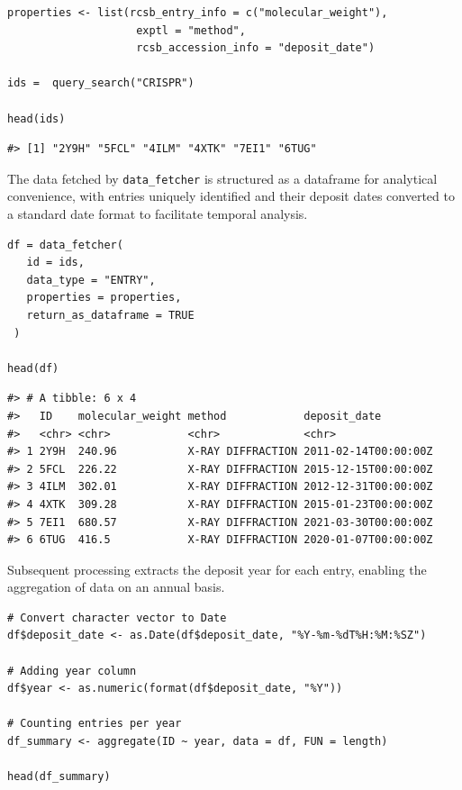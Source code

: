\begin{verbatim}
properties <- list(rcsb_entry_info = c("molecular_weight"),
                    exptl = "method",
                    rcsb_accession_info = "deposit_date")

ids =  query_search("CRISPR")

head(ids)
\end{verbatim}

\begin{verbatim}
#> [1] "2Y9H" "5FCL" "4ILM" "4XTK" "7EI1" "6TUG"
\end{verbatim}

The data fetched by \texttt{data\_fetcher} is structured as a dataframe for analytical convenience, with entries uniquely identified and their deposit dates converted to a standard date format to facilitate temporal analysis.

\begin{verbatim}
df = data_fetcher(
   id = ids,
   data_type = "ENTRY",
   properties = properties,
   return_as_dataframe = TRUE
 )

head(df)
\end{verbatim}

\begin{verbatim}
#> # A tibble: 6 x 4
#>   ID    molecular_weight method            deposit_date        
#>   <chr> <chr>            <chr>             <chr>               
#> 1 2Y9H  240.96           X-RAY DIFFRACTION 2011-02-14T00:00:00Z
#> 2 5FCL  226.22           X-RAY DIFFRACTION 2015-12-15T00:00:00Z
#> 3 4ILM  302.01           X-RAY DIFFRACTION 2012-12-31T00:00:00Z
#> 4 4XTK  309.28           X-RAY DIFFRACTION 2015-01-23T00:00:00Z
#> 5 7EI1  680.57           X-RAY DIFFRACTION 2021-03-30T00:00:00Z
#> 6 6TUG  416.5            X-RAY DIFFRACTION 2020-01-07T00:00:00Z
\end{verbatim}

Subsequent processing extracts the deposit year for each entry, enabling the aggregation of data on an annual basis.

\begin{verbatim}
# Convert character vector to Date
df$deposit_date <- as.Date(df$deposit_date, "%Y-%m-%dT%H:%M:%SZ")

# Adding year column
df$year <- as.numeric(format(df$deposit_date, "%Y"))

# Counting entries per year
df_summary <- aggregate(ID ~ year, data = df, FUN = length)

head(df_summary)
\end{verbatim}

